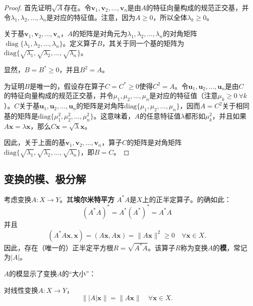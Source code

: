 \begin{proof}
    首先证明$\sqrt{A}$存在。令$\mathbf{v}_{1},\mathbf{v}_{2},\ldots,\mathbf{v}_{n}$是由$A$的特征向量构成的规范正交基，并令$\lambda_{1},\lambda_{2},\ldots,\lambda_{n}$是对应的特征值。注意，因为$A\ge 0$，所以全体$\lambda_k\ge 0$。

    关于基$\mathbf{v}_{1},\mathbf{v}_{2},\ldots,\mathbf{v}_{n}$，$A$的矩阵是对角元为$\lambda_{1},\lambda_{2},\ldots,\lambda_{n}$的对角\linebreak 矩阵$\operatorname{diag}\{\lambda_{1},\lambda_{2},\ldots,\lambda_{n}\}$。定义算子$B$，其关于同一个基的矩阵为\linebreak $\mathrm{diag}\{\sqrt{\lambda_{1}},\sqrt{\lambda_{2}},\ldots,\sqrt{\lambda_{n}}\}$。

    显然，$B=B^*\ge 0$，并且$B^2=A$。

    为证明$B$是唯一的，假设存在算子$C=C^*\ge 0$使得$C^2=A$。令$\mathbf{u}_1,\mathbf{u}_2,\ldots,\mathbf{u}_n$是由$C$的特征向量构成的规范正交基，并令$\mu_{1},\mu_{2},\ldots,\mu_{n}$是对应的特征值（注意$\mu_k\ge 0\ \forall k$）。$C$关于基$\mathbf{u}_1,\mathbf{u}_2,\ldots,\mathbf{u}_n$的矩阵是对角阵$\mathrm{diag}\{\mu_{1},\mu_{2},\ldots,\mu_{n}\}$，因而$A=C^2$关于相同基的矩阵是$\mathrm{diag}\{\mu_{1}^{2},\mu_{2}^{2},\ldots,\mu_{n}^{2}\}$。这意味着，$A$的任意特征值$\lambda$都形如$\mu_k^2$，并且如果$A\mathbf{x}=\lambda\mathbf{x}$，那么$C\mathbf{x}=\sqrt\lambda\mathbf{x}$。

    因此，关于上面的基$\mathbf{v}_{1},\mathbf{v}_{2},\ldots,\mathbf{v}_{n}$，算子$C$的矩阵是对角矩阵\linebreak $\mathrm{diag}\{\sqrt{\lambda_{1}},\sqrt{\lambda_{2}},\ldots,\sqrt{\lambda_{n}}\}$，即$B=C$。
\end{proof}

\subsection{变换的模、极分解}

考虑变换$A:X\to Y$。其{\bf 埃尔米特平方} $A^*A$是$X$上的正半定算子。的确如此：
\[(A^*A)^*=A^*(A^*)^*=A^*A\]
并且\[(A^*A\mathbf{x},\mathbf{x})=(A\mathbf{x},A\mathbf{x})=\|A\mathbf{x}\|^2\geq0\quad\forall\mathbf{x}\in X.\]
因此，存在（唯一的）正半定平方根$R=\sqrt{A^*A}$。该算子$R$称为变换$A$的{\bf 模}，常记为$|A|$。

$A$的模显示了变换$A$的“大小”：
\begin{proposition}\label{prop:modulus_preserve_norm}
    对线性变换$A:X\to Y$，\[\||A|\mathbf{x}\|=\|A\mathbf{x}\|\quad\forall\mathbf{x}\in X.\]
\end{proposition}

